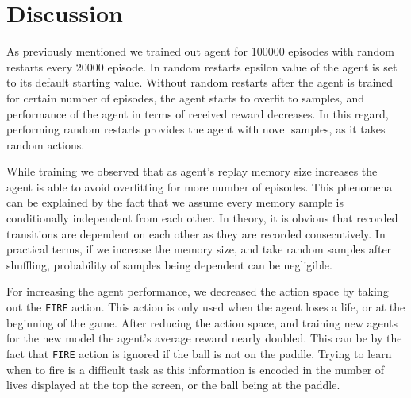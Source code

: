 \section{Discussion}
As previously mentioned we trained out agent for 100000 episodes with random restarts every 20000 episode. In random restarts epsilon value of the agent is set to its default starting value. Without random restarts after the agent is trained for certain number of episodes, the agent starts to overfit to samples, and performance of the agent in terms of received reward decreases. In this regard, performing random restarts provides the agent with novel samples, as it takes random actions.

While training we observed that as agent's replay memory size increases the agent is able to avoid overfitting for more number of episodes. This phenomena can be explained by the fact that we assume every memory sample is conditionally independent from each other. In theory, it is obvious that recorded transitions are dependent on each other as they are recorded consecutively. In practical terms, if we increase the memory size, and take random samples after shuffling, probability of samples being dependent can be negligible.

For increasing the agent performance, we decreased the action space by taking out the \verb+FIRE+ action. This action is only used when the agent loses a life, or at the beginning of the game. After reducing the action space, and training new agents for the new model the agent's average reward nearly doubled. This can be by the fact that \verb+FIRE+ action is ignored if the ball is not on the paddle. Trying to learn when to fire is a difficult task as this information is encoded in the number of lives displayed at the top the screen, or the ball being at the paddle.
